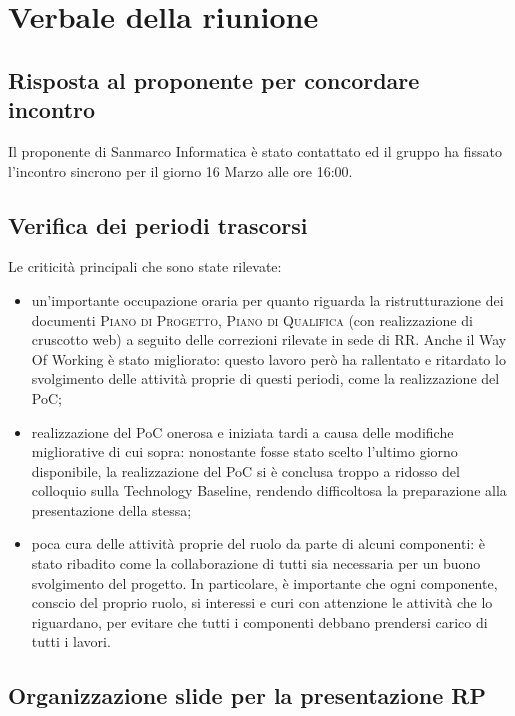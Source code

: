 \section{Verbale della riunione}

\subsection{Risposta al proponente per concordare incontro}

Il proponente di Sanmarco Informatica è stato contattato ed il gruppo ha fissato l'incontro sincrono per il giorno 16 Marzo alle ore 16:00.


\subsection{Verifica dei periodi trascorsi}

Le criticità principali che sono state rilevate:
\begin{itemize}
	\item un'importante occupazione oraria per quanto riguarda la ristrutturazione dei documenti \textsc{Piano di Progetto}, \textsc{Piano di Qualifica} (con realizzazione di cruscotto web) a seguito delle correzioni rilevate in sede di RR. Anche il Way Of Working è stato migliorato: questo lavoro però ha rallentato e ritardato lo svolgimento delle attività proprie di questi periodi, come la realizzazione del PoC;
	\item realizzazione del PoC onerosa e iniziata tardi a causa delle modifiche migliorative di cui sopra: nonostante fosse stato scelto l'ultimo giorno disponibile, la realizzazione del PoC si è conclusa troppo a ridosso del colloquio sulla Technology Baseline, rendendo difficoltosa la preparazione alla presentazione della stessa;
	\item poca cura delle attività proprie del ruolo da parte di alcuni componenti: è stato ribadito come la collaborazione di tutti sia necessaria per un buono svolgimento del progetto. In particolare, è importante che ogni componente, conscio del proprio ruolo, si interessi e curi con attenzione le attività che lo riguardano, per evitare che tutti i componenti debbano prendersi carico di tutti i lavori.
\end{itemize}


\subsection{Organizzazione slide per la presentazione RP}

